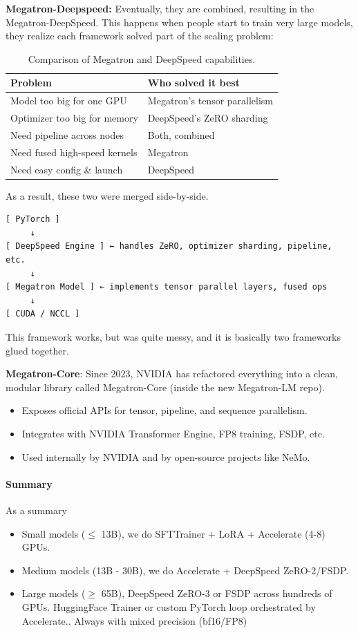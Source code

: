 \documentclass[11pt]{article}  %
\begin{document}
\textbf{Megatron-Deepspeed:} Eventually, they are combined, resulting in the Megatron-DeepSpeed.
This happens when people start to train very large models, they realize each framework solved part of the scaling problem:
\begin{table}[h!]
\centering
\caption{Comparison of Megatron and DeepSpeed capabilities.}
\label{tab:megatron_deepspeed}
\begin{tabular}{ll}
\hline
\textbf{Problem} & \textbf{Who solved it best} \\
\hline
Model too big for one GPU      & Megatron's tensor parallelism \\
Optimizer too big for memory   & DeepSpeed's ZeRO sharding \\
Need pipeline across nodes     & Both, combined \\
Need fused high-speed kernels  & Megatron \\
Need easy config \& launch     & DeepSpeed \\
\hline
\end{tabular}
\end{table}
As a result, these two were merged side-by-side.
\begin{verbatim}
[ PyTorch ]
     ↓
[ DeepSpeed Engine ] ← handles ZeRO, optimizer sharding, pipeline, etc.
     ↓
[ Megatron Model ] ← implements tensor parallel layers, fused ops
     ↓
[ CUDA / NCCL ]
\end{verbatim}
This framework works, but was quite messy, and it is basically two frameworks glued together.

\textbf{Megatron-Core}: Since 2023, NVIDIA has refactored everything into a clean, modular library called Megatron-Core (inside the new Megatron-LM repo). 
\begin{itemize}
  \item Exposes official APIs for tensor, pipeline, and sequence parallelism.
  \item Integrates with NVIDIA Transformer Engine, FP8 training, FSDP, etc.
  \item Used internally by NVIDIA and by open-source projects like NeMo.
\end{itemize}


\paragraph{Summary}
As a summary 
\begin{itemize}
  \item Small models ($\leq$ 13B), we do SFTTrainer + LoRA + Accelerate (4-8) GPUs.
  \item Medium models (13B - 30B), we do Accelerate + DeepSpeed ZeRO-2/FSDP.
  \item Large models ($\geq$ 65B), DeepSpeed ZeRO-3 or FSDP across hundreds of GPUs. HuggingFace Trainer or custom PyTorch loop orchestrated by Accelerate.. Always with mixed precision (bf16/FP8)
\end{itemize}
\end{document}
